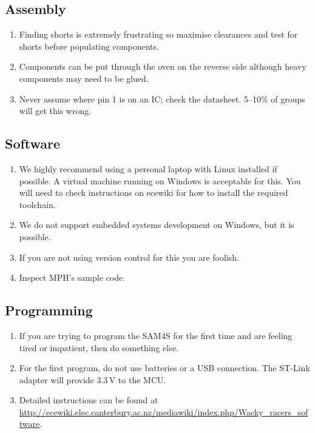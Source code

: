 \documentclass[11pt, a4paper]{article}
\begin{document}
\subsection{Assembly}

\begin{enumerate}
\item Finding shorts is extremely frustrating so maximise clearances
  and test for shorts before populating components.

\item Components can be put through the oven on the reverse side
  although heavy components may need to be glued.
  
\item Never assume where pin 1 is on an IC; check the datasheet.
  5--10\% of groups will get this wrong.
  
\end{enumerate}


\subsection{Software}

\begin{enumerate}
\item We highly recommend using a personal laptop with Linux installed if
possible. A virtual machine running on Windows is acceptable for this. You will
need to check instructions on ecewiki for how to install the required toolchain.

\item We do not support embedded systems development on Windows, but
  it is possible.

\item If you are not using version control for this you are foolish.

\item Inspect MPH's sample code.

\end{enumerate}


\subsection{Programming}

\begin{enumerate}
\item If you are trying to program the SAM4S for the first time and
  are feeling tired or impatient, then do something else.

\item For the first program, do not use batteries or a USB connection.
  The ST-Link adapter will provide 3.3\,V to the MCU.
 
\item Detailed instructions can be found at
  \url{http://ecewiki.elec.canterbury.ac.nz/mediawiki/index.php/Wacky_racers_software}.
\end{enumerate}
\end{document}
